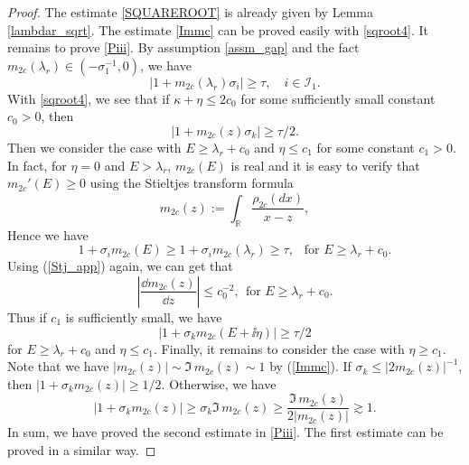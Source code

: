 \begin{proof}
The estimate \eqref{SQUAREROOT} is already given by Lemma \ref{lambdar_sqrt}. The estimate \eqref{Immc} can be proved easily with \eqref{sqroot4}. 
It remains to prove \eqref{Piii}. By assumption \eqref{assm_gap} and the fact $m_{2c}(\lambda_r) \in (-\sigma_1^{-1}, 0)$, we have
$$\left| 1+ m_{2c}(\lambda_r) \sigma_i \right| \ge \tau,  \quad i\in \mathcal I_1.$$
With \eqref{sqroot4}, we see that if $\kappa+\eta \le 2c_0$ for some sufficiently small constant $c_0>0$, then
$$\left| 1+ m_{2c}(z)\sigma_k \right| \ge \tau/2.$$
Then we consider the case with $E \ge \lambda_r + c_0$ and $\eta \le c_1$ for some constant $c_1>0$. In fact, for $\eta=0$ and $E> \lambda_r$, $m_{2c}(E)$ is real and it is easy to verify that $m_{2c}'(E)\ge 0$ using 
the Stieltjes transform formula 
\begin{equation}\label{Stj_app}
m_{2c}(z):=\int_{\mathbb R} \frac{\rho_{2c}(dx)}{x-z},
\end{equation}
Hence we have
$$ 1+ \sigma_i m_{2c}(E)  \ge 1+ \sigma_i m_{2c}(\lambda_r ) \ge \tau, \ \ \text{ for }E\ge \lambda_r + c_0.$$
Using (\ref{Stj_app}) again, we can get that 
$$\left|\frac{\dd m_{2c}(z)}{ \dd z }\right| \le c_0^{-2}, \ \ \text{for } E\ge \lambda_r + c_0.$$ 
Thus if $c_1$ is sufficiently small, we have
$$\left| 1+ \sigma_k m_{2c}(E+\ii\eta) \right| \ge  \tau/2$$
for $E\ge \lambda_r + c_0$ and $\eta \le c_1$. Finally, it remains to consider the case with $\eta \ge c_1$. Note that we have $|m_{2c}(z)| \sim \Im \, m_{2c}(z) \sim 1$ by (\ref{Immc}). If $\sigma_k \le \left|2m_{2c}(z)\right|^{-1}$, then $\left| 1+ \sigma_k m_{2c}(z) \right| \ge 1/2$. Otherwise, we have %
$$\left| 1+ \sigma_k m_{2c}(z) \right| \ge \sigma_k \Im\, m_{2c}(z) \ge \frac{\Im\, m_{2c}(z)}{2 |m_{2c}(z)|}\gtrsim 1 .$$
In sum, we have proved the second estimate in \eqref{Piii}. The first estimate can be proved in a similar way. 
\end{proof}


